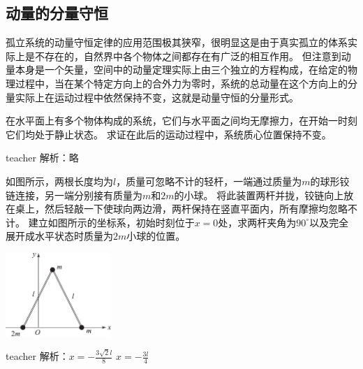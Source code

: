 \subsection{动量的分量守恒}

孤立系统的动量守恒定律的应用范围极其狭窄，很明显这是由于真实孤立的体系实际上是不存在的，自然界中各个物体之间都存在有广泛的相互作用。
但注意到动量本身是一个矢量，空间中的动量定理实际上由三个独立的方程构成，在给定的物理过程中，当在某个特定方向上的合外力为零时，系统的总动量在这个方向上的分量实际上在运动过程中依然保持不变，这就是动量守恒的分量形式。




\begin{example}

在水平面上有多个物体构成的系统，它们与水平面之间均无摩擦力，在开始一时刻它们均处于静止状态。
求证在此后的运动过程中，系统质心位置保持不变。

\begin{taggedblock}{teacher}
\noindent
解析：略
\end{taggedblock}
\end{example}



\begin{example}

如图所示，两根长度均为$l$，质量可忽略不计的轻杆，一端通过质量为$m$的球形铰链连接，另一端分别接有质量为$m$和$2m$的小球。
将此装置两杆并拢，铰链向上放在桌上，然后轻敲一下使球向两边滑，两杆保持在竖直平面内，所有摩擦均忽略不计。
建立如图所示的坐标系，初始时刻位于$x=0$处，求两杆夹角为$90^\circ$以及完全展开成水平状态时质量为$2m$小球的位置。
	\begin{flushright}
		\includegraphics[width = 0.3\textwidth]{images/momentum-4.pdf} 
	\end{flushright}
\begin{taggedblock}{teacher}
\noindent
解析：$x=-\frac{3\sqrt{2}l}{8}$     $x=-\frac{3l}{4}$
\end{taggedblock}
\end{example}



